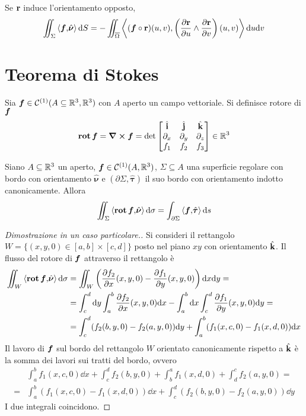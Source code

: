 \begin{remark}
	Se $\vb{r}$ induce l'orientamento opposto,
	$$
		\iint_\Sigma \left\langle\bm f{,}\hat{\bm\nu}\right\rangle\dd S = -\iint_{\overline{\Omega}}\left\langle(\bm f\circ\vb{r})(u,v){,}\left(\frac{\partial \vb{r}}{\partial u}\wedge \frac{\partial \vb{r}}{\partial v}\right)(u,v)\right\rangle\dd u \dd v
	$$
\end{remark}

\section{Teorema di Stokes}

\begin{definition}
	[Rotore]
	Sia $\bm f\in \mathcal{C}^{(1)}(A\subseteq \mathbb{R}^3,\mathbb{R}^3)$ con $A$ aperto un campo vettoriale. Si definisce rotore di $\bm f$
	$$
		\operatorname{\vb{rot}} \bm f=\curl \bm f=\det
		\begin{bmatrix}
			\hat{\vb{i}} & \hat{\vb{j}} & \hat{\vb{k}}\\
			\partial_x & \partial_y & \partial_z\\
			f_1 & f_2 & f_3
		\end{bmatrix}
		\in \mathbb{R}^3
	$$
\end{definition}

\begin{theorem}
	Siano $A \subseteq \mathbb{R}^3$ un aperto, $\bm f \in \mathcal{C}^{(1)}(A,\mathbb{R}^3)$, $\Sigma \subseteq A$ una superficie regolare con bordo con orientamento $\hat{\bm \nu}$ e $(\partial \Sigma,\hat{\bm \tau})$ il suo bordo con orientamento indotto canonicamente. Allora
	$$
		\iint_\Sigma \left\langle\operatorname{\vb{rot}} \bm f{,}\hat{\bm \nu}\right\rangle\dd \sigma = \int_{\partial\Sigma}\left\langle\bm f{,}\hat{\bm \tau}\right\rangle\dd s
	$$
\end{theorem}

\begin{proof}
	[Dimostrazione in un caso particolare.]
	Si consideri il rettangolo $W=\{(x,y,0)\in[a,b]\times[c,d]\}$ posto nel piano $xy$ con orientamento $\hat{\vb{k}}$. Il flusso del rotore di $\bm f$ attraverso il rettangolo è
	\begin{align*}
		\iint_W \left\langle\operatorname{\vb{rot}} \bm f{,}\hat{\bm \nu}\right\rangle\dd \sigma
		&= \iint_{W}\left(\frac{\partial f_2}{\partial x}(x,y,0)-\frac{\partial f_1}{\partial y}(x,y,0)\right)\dd x \dd y=\\
		&=\int_c^d \dd y\int_a^b\frac{\partial f_2}{\partial x}(x,y,0)\dd x-
		\int_a^b\dd x\int_c^d\frac{\partial f_1}{\partial y}(x,y,0)\dd y=\\
		&=\int_c^d(f_2(b,y,0)-f_2(a,y,0))\dd y+\int_a^b(f_1(x,c,0)-f_1(x,d,0))\dd x
	\end{align*}
	Il lavoro di $\bm f$ sul bordo del rettangolo $W$ orientato canonicamente rispetto a $\hat{\vb{k}}$ è la somma dei lavori sui tratti del bordo, ovvero
	\begin{align*}
		&\int_a^bf_1(x,c,0)\dd x+\int_c^df_2(b,y,0)+\int_b^af_1(x,d,0)+\int_d^cf_2(a,y,0)=\\
		=&\int_a^b(f_1(x,c,0)-f_1(x,d,0))\dd x+\int_c^d(f_2(b,y,0)-f_2(a,y,0))\dd y
	\end{align*}
	I due integrali coincidono.
\end{proof}

